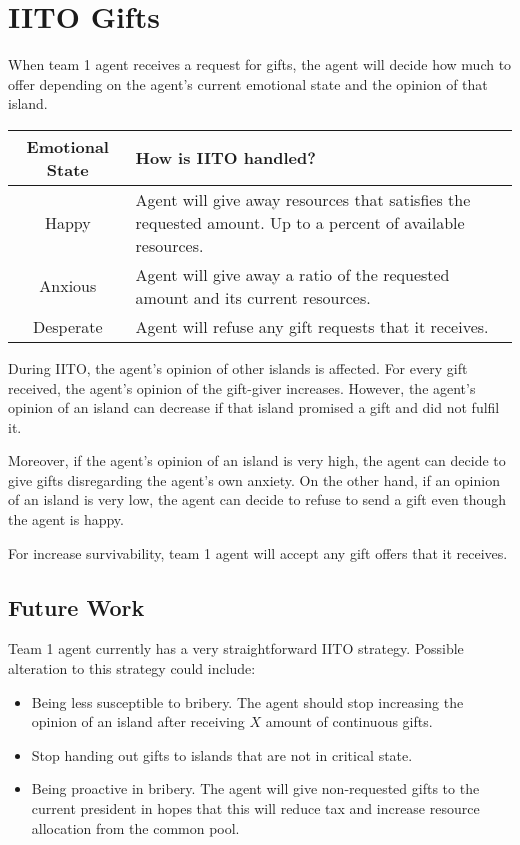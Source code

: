 \section{IITO Gifts}
When team 1 agent receives a request for gifts, the agent will decide how much to offer depending on the agent's current emotional state and the opinion of that island.

\begin{table} [htb]
    \centering
    \begin{tabular}{|c|p{}|}
        \hline
        \textbf{Emotional State} & \textbf{How is IITO handled?} \\
        \hline
        Happy & Agent will give away resources that satisfies the requested amount. Up to a percent of available resources. \\
        \hline
        Anxious & Agent will give away a ratio of the requested amount and its current resources. \\
        \hline
        Desperate & Agent will refuse any gift requests that it receives. \\
        \hline
    \end{tabular}
\end{table}

During IITO, the agent's opinion of other islands is affected. For every gift received, the agent's opinion of the gift-giver increases. However, the agent's opinion of an island can decrease if that island promised a gift and did not fulfil it.

Moreover, if the agent's opinion of an island is very high, the agent can decide to give gifts disregarding the agent's own anxiety. On the other hand, if an opinion of an island is very low, the agent can decide to refuse to send a gift even though the agent is happy.

For increase survivability, team 1 agent will accept any gift offers that it receives.

\subsection{Future Work}
Team 1 agent currently has a very straightforward IITO strategy. Possible alteration to this strategy could include:
\begin{itemize}
    \item Being less susceptible to bribery. The agent should stop increasing the opinion of an island after receiving $X$ amount of continuous gifts.
    \item Stop handing out gifts to islands that are not in critical state.
    \item Being proactive in bribery. The agent will give non-requested gifts to the current president in hopes that this will reduce tax and increase resource allocation from the common pool.
\end{itemize}

